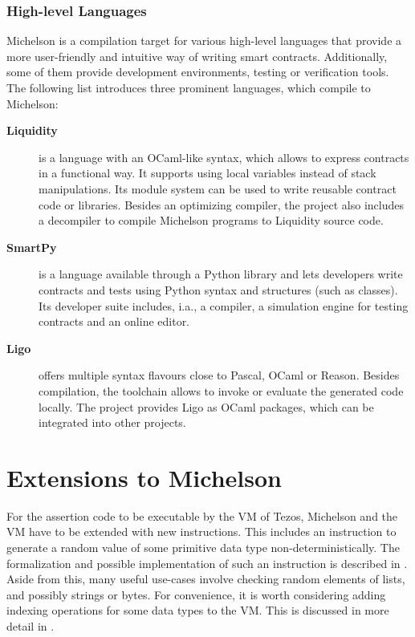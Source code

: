 \subsubsection{High-level Languages}\label{sec:languages}
Michelson is a compilation target for various high-level languages that provide a more user-friendly and intuitive way of writing smart contracts. Additionally, some of them provide development environments, testing or verification tools. The following list introduces three prominent languages, which compile to Michelson:
\begin{description}
\item[\textbf{Liquidity}] \cite{liquidity} is a language with an OCaml-like syntax, which allows to express contracts in a functional way. It supports using local variables instead of stack manipulations. Its module system can be used to write reusable contract code or libraries. Besides an optimizing compiler, the project also includes a decompiler to compile Michelson programs to Liquidity source code.
\item[\textbf{SmartPy}] \cite{smartpy} is a language available through a Python library and lets developers write contracts and tests using Python syntax and structures (such as classes). Its developer suite includes, i.a., a compiler, a simulation engine for testing contracts and an online editor.
\item [\textbf{Ligo}] \cite{ligo} offers multiple syntax flavours close to Pascal, OCaml or Reason. Besides compilation, the toolchain allows to invoke or evaluate the generated code locally. The project provides Ligo as OCaml packages, which can be integrated into other projects.
\end{description}

\section{Extensions to Michelson}\label{sec:ext_michelson}
For the assertion code to be executable by the VM of Tezos, Michelson and the VM have to be extended with new instructions. This includes an instruction to generate a random value of some primitive data type non-deterministically. The formalization and possible implementation of such an instruction is described in . Aside from this, many useful use-cases involve checking random elements of lists, and possibly strings or bytes. For convenience, it is worth considering adding indexing operations for some data types to the VM. This is discussed in more detail in .

